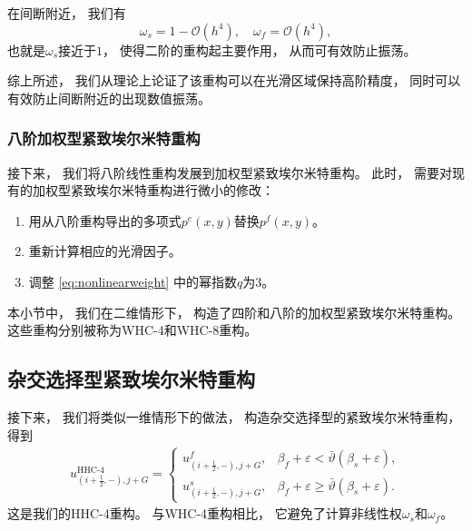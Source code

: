 在间断附近，
我们有
\begin{equation}
  \omega_{{s}}= 1-{\mathcal{O}}(h^4), \quad \omega_{{f}}= {\mathcal{O}}(h^4),
\end{equation}
也就是$\omega_{{s}}$接近于$1$，
使得二阶的重构起主要作用，
从而可有效防止振荡。

综上所述，
我们从理论上论证了该重构可以在光滑区域保持高阶精度，
同时可以有效防止间断附近的出现数值振荡。

\subsubsection{八阶加权型紧致埃尔米特重构}

接下来，
我们将八阶线性重构发展到加权型紧致埃尔米特重构。
此时，
需要对现有的加权型紧致埃尔米特重构进行微小的修改：
\begin{enumerate}
  \item 用从八阶重构导出的多项式$p^{{e}}(x,y)$替换$p^{{f}}(x,y)$。
  \item 重新计算相应的光滑因子。
  \item 调整 \cref{eq:nonlinearweight} 中的幂指数$q$为3。
\end{enumerate}

\vspace{0.5\baselineskip} %
本小节中，
我们在二维情形下，
构造了四阶和八阶的加权型紧致埃尔米特重构。
这些重构分别被称为WHC-4和WHC-8重构。

\subsection{杂交选择型紧致埃尔米特重构}

接下来，
我们将类似一维情形下的做法，
构造杂交选择型的紧致埃尔米特重构，
得到
\begin{equation}
  \label{eq:HHC4}
  \begin{aligned}
    u_{(i+\frac{1}{2},-), j+G}^{\text{HHC-4}}=
    \begin{cases}
      u_{(i+\frac{1}{2},-), j+G}^{{f}}, & \beta_{{f}}+\varepsilon < \bar{\vartheta}(\beta_{{s}}+\varepsilon),   \\
      u_{(i+\frac{1}{2},-), j+G}^{{s}}, & \beta_{{f}}+\varepsilon \ge\bar{\vartheta}(\beta_{{s}}+\varepsilon).
    \end{cases}
  \end{aligned}
\end{equation}
这是我们的HHC-4重构。
与WHC-4重构相比，
它避免了计算非线性权$\omega_{{s}}$和$\omega_{{f}}$。

